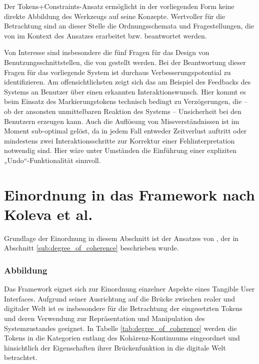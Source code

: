 Der Tokens+Constraints-Ansatz ermöglicht in der vorliegenden Form keine direkte Abbildung des Werkzeugs auf seine Konzepte. Wertvoller für die Betrachtung sind an dieser Stelle die Ordnungsschemata und Fragestellungen, die von \citet{Ullmer05} im Kontext des Ansatzes erarbeitet bzw. beantwortet werden. 

Von Interesse sind insbesondere die fünf Fragen für das Design von Benutzungsschnittstellen, die von  \citep{Bellotti02} gestellt werden. Bei der Beantwortung dieser Fragen für das vorliegende System ist durchaus Verbesserungspotential zu identifizieren. Am offensichtlichsten zeigt sich das am Beispiel des Feedbacks des Systems an Benutzer über einen erkannten Interaktionswunsch. Hier kommt es beim Einsatz des Markierungstokens technisch bedingt zu Verzögerungen, die -- ob der ansonsten unmittelbaren Reaktion des Systems -- Unsicherheit bei den Benutzern erzeugen kann. Auch die Auflösung von Missverständnissen ist im Moment sub-optimal gelöst, da in jedem Fall entweder Zeitverlust auftritt oder mindestens zwei Interaktionsschritte zur Korrektur einer Fehlinterpretation notwendig sind. Hier wäre unter Umständen die Einführung einer expliziten „Undo“-Funktionalität sinnvoll.


\section{Einordnung in das Framework nach Koleva et al.} %
\label{sec:einordnung_in_das_framework_nach_koleva_et_al_}

Grundlage der Einordnung in diesem Abschnitt ist der Ansatzes von \citep{Koleva03}, der in Abschnitt \ref{sub:degree_of_coherence} beschrieben wurde.

\subsubsection{Abbildung} %
\label{sub:abbildung}

Das Framework eignet sich zur Einordnung einzelner Aspekte eines Tangible User Interfaces. Aufgrund seiner Ausrichtung auf die Brücke zwischen realer und digitaler Welt ist es insbesondere für die Betrachtung der eingesetzten Tokens und deren Verwendung zur Repräsentation und Manipulation des Systemzustandes geeignet. In Tabelle \ref{tab:degree_of_coherence} werden die Tokens in die Kategorien entlang des Kohärenz-Kontinuums eingeordnet und hinsichtlich der Eigenschaften ihrer Brückenfunktion in die digitale Welt betrachtet. 

